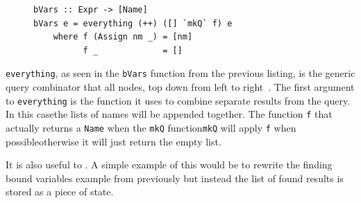 \DIFdelbegin %
\DIFdelend \DIFaddbegin \begin{figure}[t]
\begin{lstlisting}
bVars :: Expr -> [Name]
bVars e = everything (++) ([] `mkQ` f) e
	where f (Assign nm _) = [nm]
          f _             = []
\end{lstlisting}
\caption{}
\end{figure}
\DIFaddend 

\texttt{everything}, as seen in the \texttt{bVars} function from the previous listing, is the generic query combinator that \DIFdelbegin {}\DIFdelend \DIFaddbegin {}\DIFaddend all nodes, top down from left to right~\citep{sybDocs}. The first argument to \texttt{everything} is the function it uses to combine separate results from the query. In this case\DIFdelbegin {}\DIFdelend \DIFaddbegin \DIFadd{, }\DIFaddend the lists of names will be appended together. The \DIFdelbegin {}\DIFdelend \DIFaddbegin {}\DIFaddend function \texttt{f} that actually returns a \DIFaddbegin {}\DIFaddend \texttt{Name} when \DIFdelbegin {}\DIFdelend \DIFaddbegin {}\texttt{} \DIFaddend the \texttt{mkQ} function\DIFdelbegin {}\DIFdelend \DIFaddbegin \DIFadd{; }\DIFaddend \texttt{mkQ} will apply \texttt{f} when possible\DIFaddbegin \DIFadd{, }\DIFaddend otherwise it will just return \DIFaddbegin {}\DIFaddend the empty list.

It is also useful to \DIFdelbegin {}\DIFdelend \DIFaddbegin {}\DIFaddend . A simple example of this would be to rewrite the finding bound variables example from previously but instead the list of found results is stored as a piece of state.


